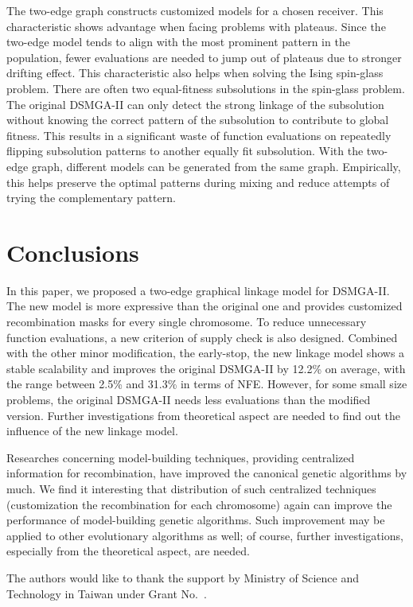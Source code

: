 The two-edge graph constructs customized models for a chosen receiver. 
This characteristic shows advantage when facing problems with plateaus.
Since the two-edge model tends to align with the most prominent pattern in the population, fewer evaluations are needed to jump out of plateaus due to stronger drifting effect. This characteristic also helps when solving the Ising spin-glass problem. 
There are often two equal-fitness subsolutions in the spin-glass problem.
The original DSMGA-II can only detect the strong linkage of the subsolution without knowing the correct pattern of the subsolution to contribute to global fitness.
This results in a significant waste of function evaluations on repeatedly flipping subsolution patterns to another equally fit subsolution.
With the two-edge graph, different models can be generated from the same graph. 
Empirically, this helps preserve the optimal patterns during mixing and reduce attempts of trying the complementary pattern.



\section{Conclusions}
 
In this paper, we proposed a two-edge graphical linkage model for DSMGA-II. 
The new model is more expressive than the original one and provides customized recombination masks for every single chromosome. 
To reduce unnecessary function evaluations, a new criterion of supply check  is also designed. Combined with the other minor modification, the early-stop, the new linkage model shows a stable scalability and improves the original DSMGA-II by 12.2\% on average, with the range between 2.5\% and 31.3\%  in terms of NFE.
However, for some small size problems, the original DSMGA-II needs less evaluations than the modified version. Further investigations from theoretical aspect are needed to find out the influence of the new linkage model.


Researches concerning model-building techniques, providing centralized information for recombination, have improved the canonical genetic algorithms by much. 
We find it interesting that distribution of such centralized techniques (customization the recombination for each chromosome) again can improve the performance of model-building genetic algorithms. 
Such improvement may be applied to other evolutionary algorithms as well; of course,  further investigations, especially from the theoretical aspect, are needed.  


\begin{acks}
The authors would like to thank the support by Ministry of Science and Technology in Taiwan under Grant
No.~.
\end{acks}
